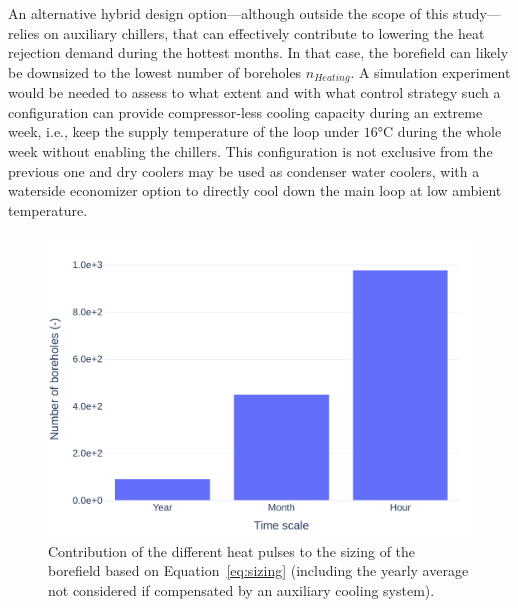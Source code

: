 An alternative hybrid design option---although outside the scope of this study---relies on auxiliary chillers, that can effectively contribute to lowering the heat rejection demand during the hottest months. In that case, the borefield can likely be downsized to the lowest number of boreholes $n_{Heating}$. A simulation experiment would be needed to assess to what extent and with what control strategy such a configuration can provide compressor-less cooling capacity during an extreme week, i.e., keep the supply temperature of the loop under $16$°C during the whole week without enabling the chillers. This configuration is not exclusive from the previous one and dry coolers may be used as condenser water coolers, with a waterside economizer option to directly cool down the main loop at low ambient temperature.

\begin{figure}[!htbp]
    \centering
    \includegraphics[width=\linewidth]{../python_scripts/figures/ContributionL.pdf}
    \caption{Contribution of the different heat pulses to the sizing of the borefield based on  Equation~\ref{eq:sizing} (including the yearly average not considered if compensated by an auxiliary cooling system).}
    \label{fig:contribution_to_L}
\end{figure}

